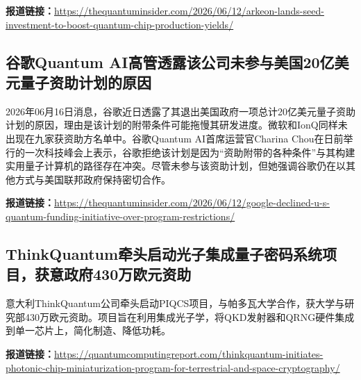 \documentclass[12pt,a4paper]{ctexart}
\begin{document}
\noindent\textbf{报道链接：}\url{https://thequantuminsider.com/2026/06/12/arkeon-lands-seed-investment-to-boost-quantum-chip-production-yields/}

\subsection{ 谷歌Quantum AI高管透露该公司未参与美国20亿美元量子资助计划的原因 }

2026年06月16日消息，谷歌近日透露了其退出美国政府一项总计20亿美元量子资助计划的原因，理由是该计划的附带条件可能拖慢其研发进度。微软和IonQ同样未出现在九家获资助方名单中。谷歌Quantum AI首席运营官Charina Chou在日前举行的一次科技峰会上表示，谷歌拒绝该计划是因为“资助附带的各种条件”与其构建实用量子计算机的路径存在冲突。尽管未参与该资助计划，但她强调谷歌仍在以其他方式与美国联邦政府保持密切合作。

\noindent\textbf{报道链接：}\url{https://thequantuminsider.com/2026/06/12/google-declined-u-s-quantum-funding-initiative-over-program-restrictions/}

\subsection{ ThinkQuantum牵头启动光子集成量子密码系统项目，获意政府430万欧元资助 }

意大利ThinkQuantum公司牵头启动PIQCS项目，与帕多瓦大学合作，获大学与研究部430万欧元资助。项目旨在利用集成光子学，将QKD发射器和QRNG硬件集成到单一芯片上，简化制造、降低功耗。

\noindent\textbf{报道链接：}\url{https://quantumcomputingreport.com/thinkquantum-initiates-photonic-chip-miniaturization-program-for-terrestrial-and-space-cryptography/}
\end{document}
